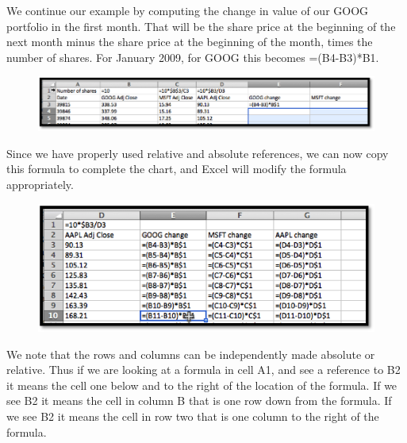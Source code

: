 \documentclass[10pt,]{book}
\theoremstyle{plain}
\theoremstyle{definition}
\theoremstyle{definition}
\begin{document}
We continue our example by computing the change in value of our GOOG portfolio in the first month.  That will be the share price at the beginning of the next month minus the share price at the beginning of the month, times the number of shares.  For January 2009, for GOOG this becomes =(B4-B3)*B\textdollar{}1.%
\leavevmode%
\begin{figure}
\centering
\includegraphics[width=0.9\linewidth]{images/sec1-3-11.png}
\end{figure}
\par
Since we have properly used relative and absolute references, we can now copy this formula to complete the chart, and Excel will modify the formula appropriately.%
\leavevmode%
\begin{figure}
\centering
\includegraphics[width=0.8\linewidth]{images/sec1-3-12.png}
\end{figure}
\par
We note that the rows and columns can be independently made absolute or relative.  Thus if we are looking at a formula in cell A1, and see a reference to B2 it means the cell one below and to the right of the location of the formula.  If we see \textdollar{}B2 it means the cell in column B that is one row down from the formula.  If we see B\textdollar{}2 it means the cell in row two that is one column to the right of the formula.%
\par
\end{document}
